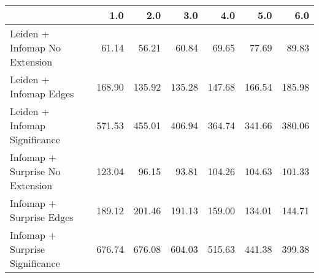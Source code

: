 \begin{tabular}{lrrrrrr}
\toprule
{} &    1.0 &    2.0 &    3.0 &    4.0 &    5.0 &    6.0 \\
\midrule
Leiden + Infomap No Extension   &  61.14 &  56.21 &  60.84 &  69.65 &  77.69 &  89.83 \\
Leiden + Infomap Edges          & 168.90 & 135.92 & 135.28 & 147.68 & 166.54 & 185.98 \\
Leiden + Infomap Significance   & 571.53 & 455.01 & 406.94 & 364.74 & 341.66 & 380.06 \\
Infomap + Surprise No Extension & 123.04 &  96.15 &  93.81 & 104.26 & 104.63 & 101.33 \\
Infomap + Surprise Edges        & 189.12 & 201.46 & 191.13 & 159.00 & 134.01 & 144.71 \\
Infomap + Surprise Significance & 676.74 & 676.08 & 604.03 & 515.63 & 441.38 & 399.38 \\
\bottomrule
\end{tabular}
